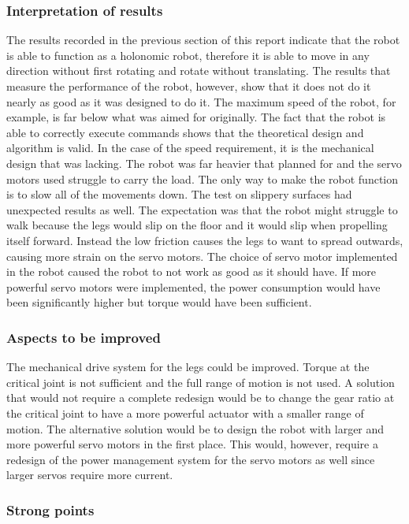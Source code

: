 \newpage
\subsubsection{Interpretation of results}
The results recorded in the previous section of this report indicate that the robot is able to function as a holonomic robot, therefore it is able to move in any direction without first rotating and rotate without translating. The results that measure the performance of the robot, however, show that it does not do it nearly as good as it was designed to do it. The maximum speed of the robot, for example, is far below what was aimed for originally. The fact that the robot is able to correctly execute commands shows that the theoretical design and algorithm is valid. In the case of the speed requirement, it is the mechanical design that was lacking. The robot was far heavier that planned for and the servo motors used struggle to carry the load. The only way to make the robot function is to slow all of the movements down. The test on slippery surfaces had unexpected results as well. The expectation was that the robot might struggle to walk because the legs would slip on the floor and it would slip when propelling itself forward. Instead the low friction causes the legs to want to spread outwards, causing more strain on the servo motors. The choice of servo motor implemented in the robot caused the robot to not work as good as it should have. If more powerful servo motors were implemented, the power consumption would have been significantly higher but torque would have been sufficient.  

\subsubsection{Aspects to be improved}
The mechanical drive system for the legs could be improved. Torque at the critical joint is not sufficient and the full range of motion is not used. A solution that would not require a complete redesign would be to change the gear ratio at the critical joint to have a more powerful actuator with a smaller range of motion. The alternative solution would be to design the robot with larger and more powerful servo motors in the first place. This would, however, require a redesign of the power management system for the servo motors as well since larger servos require more current.

\subsubsection{Strong points}


